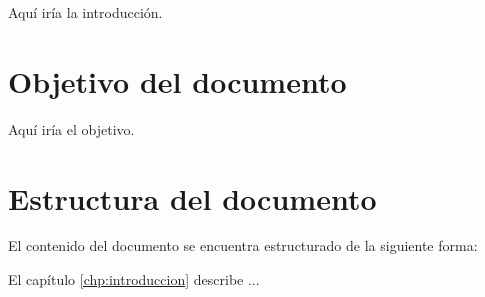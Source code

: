 \label{sec:introduccion}


Aquí iría la introducción.


\section{Objetivo del documento}
\label{gls:Objetivo del documento}

Aquí iría el objetivo.

\section{Estructura del documento}
\label{gls:Estructura del documento}
El contenido del documento se encuentra estructurado de la siguiente forma:\\

\begin{Citemize}
	
	\item El capítulo \ref{chp:introduccion} describe ...
	
	
	
	
\end{Citemize}


















